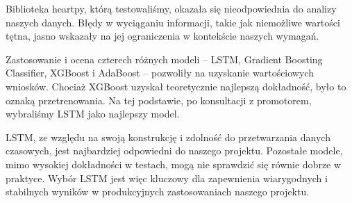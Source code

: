 \documentclass[12pt,a4paper]{article}
\begin{document}
Biblioteka heartpy, którą testowaliśmy, okazała się nieodpowiednia do analizy naszych danych. Błędy w wyciąganiu informacji, takie jak niemożliwe wartości tętna, jasno wskazały na jej ograniczenia w kontekście naszych wymagań.

Zastosowanie i ocena czterech różnych modeli – LSTM, Gradient Boosting Classifier, XGBoost i AdaBoost – pozwoliły na uzyskanie wartościowych wniosków. Chociaż XGBoost uzyskał teoretycznie najlepszą dokładność, było to oznaką przetrenowania. Na tej podstawie, po konsultacji z promotorem, wybraliśmy LSTM jako najlepszy model.

LSTM, ze względu na swoją konstrukcję i zdolność do przetwarzania danych czasowych, jest najbardziej odpowiedni do naszego projektu. Pozostałe modele, mimo wysokiej dokładności w testach, mogą nie sprawdzić się równie dobrze w praktyce. Wybór LSTM jest więc kluczowy dla zapewnienia wiarygodnych i stabilnych wyników w produkcyjnych zastosowaniach naszego projektu.

\newpage


\end{document}
